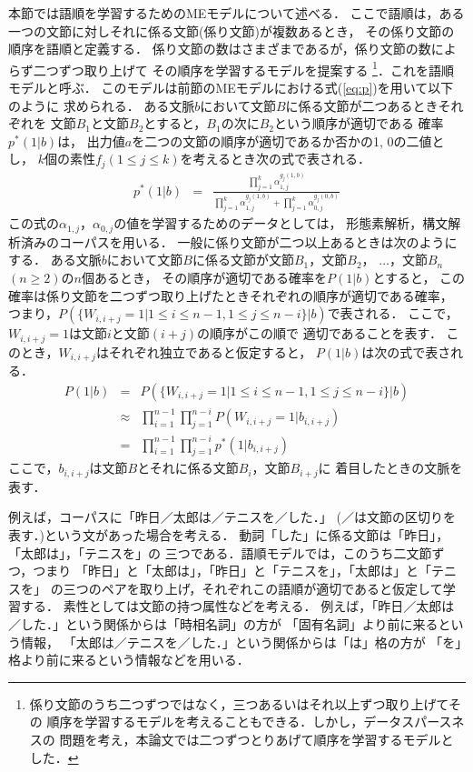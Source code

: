 本節では語順を学習するためのMEモデルについて述べる．
ここで語順は，ある一つの文節に対しそれに係る文節(係り文節)が複数あるとき，
その係り文節の順序を語順と定義する．
係り文節の数はさまざまであるが，係り文節の数によらず二つずつ取り上げて
その順序を学習するモデルを提案する
\footnote{
  係り文節のうち二つずつではなく，三つあるいはそれ以上ずつ取り上げてその
  順序を学習するモデルを考えることもできる．しかし，データスパースネスの
  問題を考え，本論文では二つずつとりあげて順序を学習するモデルとした．
}．これを語順モデルと呼ぶ．
このモデルは前節のMEモデルにおける式(\ref{eq:p})を用いて以下のように
求められる．
ある文脈$b$において文節$B$に係る文節が二つあるときそれぞれを
文節$B_1$と文節$B_2$とすると，$B_1$の次に$B_2$という順序が適切である
確率$p^{*}(1|b)$は，
出力値$a$を二つの文節の順序が適切であるか否かの1, 0の二値とし，
$k$個の素性$f_j (1\leq j\leq k)$を考えるとき次の式で表される．
\begin{eqnarray}
  \label{eq:p1}
  p^{*}(1|b) & = & \frac{\prod_{j=1}^{k}\alpha_{1,j}^{g_{j}(1,b)}}
  {\prod_{j=1}^{k}\alpha_{1,j}^{g_{j}(1,b)} 
    + \prod_{j=1}^{k}\alpha_{0,j}^{g_{j}(0,b)}}
\end{eqnarray}
この式の$\alpha_{1,j}$，$\alpha_{0,j}$の値を学習するためのデータとしては，
形態素解析，構文解析済みのコーパスを用いる．
一般に係り文節が二つ以上あるときは次のようにする．
ある文脈$b$において文節$B$に係る文節が文節$B_1$，文節$B_2$，
$\ldots$，文節$B_n$ $(n\geq 2)$の$n$個あるとき，
その順序が適切である確率を$P(1|b)$とすると，
この確率は係り文節を二つずつ取り上げたときそれぞれの順序が適切である確率，
つまり，$P(\{W_{i,i+j}=1|1\leq i\leq n-1, 1\leq j\leq n-i\}|b)$で表される．
ここで，$W_{i,i+j}=1$は文節$i$と文節$(i+j)$の順序がこの順で
適切であることを表す．
このとき，$W_{i,i+j}$はそれぞれ独立であると仮定すると，
$P(1|b)$は次の式で表される．
\clearpage
\begin{eqnarray}
  \label{eq:p2}
  P(1|b) 
  & = & P(\{W_{i,i+j}=1|1\leq i\leq n-1, 1\leq j\leq n-i\}|b) \nonumber\\
  & \approx 
  & \prod_{i=1}^{n-1}\prod_{j=1}^{n-i}P(W_{i,i+j}=1|b_{i,i+j}) \nonumber\\
  & = & \prod_{i=1}^{n-1}\prod_{j=1}^{n-i}p^{*}(1|b_{i,i+j})
\end{eqnarray}
ここで，$b_{i,i+j}$は文節$B$とそれに係る文節$B_i$，文節$B_{i+j}$に
着目したときの文脈を表す．

例えば，コーパスに「昨日／太郎は／テニスを／した．」
(／は文節の区切りを表す．)という文があった場合を考える．
動詞「した」に係る文節は「昨日」，「太郎は」，「テニスを」の
三つである．語順モデルでは，このうち二文節ずつ，つまり
「昨日」と「太郎は」，「昨日」と「テニスを」，「太郎は」と「テニスを」
の三つのペアを取り上げ，それぞれこの語順が適切であると仮定して学習する．
素性としては文節の持つ属性などを考える．
例えば，「昨日／太郎は／した．」という関係からは「時相名詞」の方が
「固有名詞」より前に来るという情報，
「太郎は／テニスを／した．」という関係からは「は」格の方が
「を」格より前に来るという情報などを用いる．

